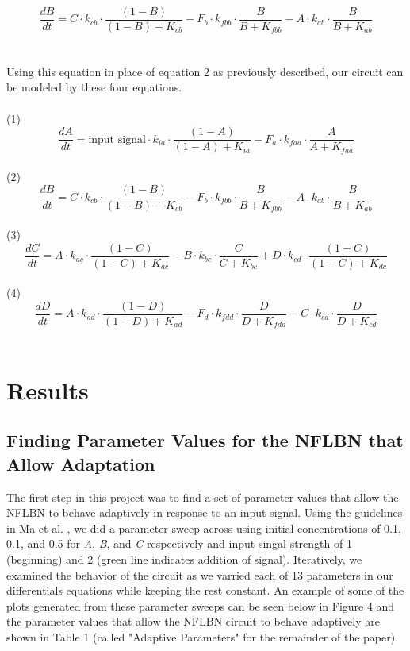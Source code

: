 \documentclass{article}
\begin{document}
\\
\[
\frac{dB}{dt} = C \cdot k_{cb} \cdot \frac{(1 - B)}{(1 - B) + K_{cb}} - F_b \cdot k_{fbb} \cdot \frac{B}{B + K_{fbb}} - A \cdot k_{ab} \cdot \frac{B}{B + K_{ab}}
\]
\\
\\

Using this equation in place of equation 2 as previously described, our circuit can be modeled by these four equations. 
\\
\\
(1)
\[
\frac{dA}{dt} = \text{input\_signal} \cdot k_{ia} \cdot \frac{(1 - A)}{(1 - A) + K_{ia}} - F_a \cdot k_{faa} \cdot \frac{A}{A + K_{faa}}
\]
\\
(2)
\[
\frac{dB}{dt} = C \cdot k_{cb} \cdot \frac{(1 - B)}{(1 - B) + K_{cb}} - F_b \cdot k_{fbb} \cdot \frac{B}{B + K_{fbb}} - A \cdot k_{ab} \cdot \frac{B}{B + K_{ab}}
\]
\\
(3)
\[
\frac{dC}{dt} = A \cdot k_{ac} \cdot \frac{(1 - C)}{(1 - C) + K_{ac}} - B \cdot k_{bc} \cdot \frac{C}{C + K_{bc}} + D \cdot k_{cd} \cdot \frac{(1 - C)}{(1 - C) + K_{dc}}
\]
\\
(4)
\[
\frac{dD}{dt} = A \cdot k_{ad} \cdot \frac{(1 - D)}{(1 - D) + K_{ad}} - F_d \cdot k_{fdd} \cdot \frac{D}{D + K_{fdd}} - C \cdot k_{cd} \cdot \frac{D}{D + K_{cd}}
\]
\\

\section{Results}

\subsection{Finding Parameter Values for the NFLBN that Allow Adaptation}

The first step in this project was to find a set of parameter values that allow the NFLBN to behave adaptively in response to an input signal. Using the guidelines in Ma et al. \cite{challenge2paperD2L}, we did a parameter sweep across using initial concentrations of 0.1, 0.1, and 0.5 for \textit{A}, \textit{B}, and \textit{C} respectively and input singal strength of 1 (beginning) and 2 (green line indicates addition of signal). Iteratively, we examined the behavior of the circuit as we varried each of 13 parameters in our differentials equations while keeping the rest constant. An example of some of the plots generated from these parameter sweeps can be seen below in Figure 4 and the parameter values that allow the NFLBN circuit to behave adaptively are shown in Table 1 (called "Adaptive Parameters" for the remainder of the paper). 
\end{document}
